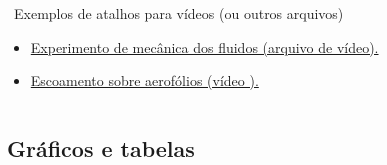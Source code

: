 \begin{frame}
\begin{columns}[t]
		\begin{exampleblock}{\faExternalLinkSquare*\ Exemplos de atalhos para vídeos (ou outros arquivos)}
			
			\begin{itemize}
				\item[\tiny\faFileVideo] \href{run:./Multimedia/flow-experiment.flv}{Experimento de mecânica dos fluidos (arquivo de vídeo).}
				\item[\tiny\faFileVideo] \href{https://youtu.be/6UlsArvbTeo?si=aU2mbh-XGX3o6nWe}{Escoamento sobre aerofólios (vídeo ).}
			\end{itemize}
			
		\end{exampleblock}
		
	\end{columns}
	
\end{frame}

\subsection{Gráficos e tabelas}


